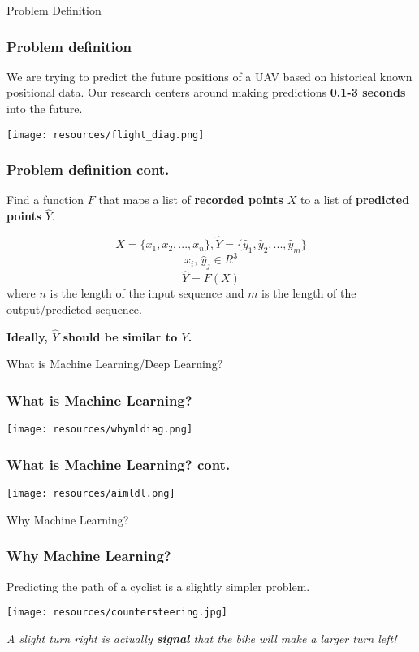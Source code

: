 \documentclass{beamer}
\begin{document}
\begin{frame}[standout]
    Problem Definition
\end{frame}

\begin{frame}
    \frametitle{Problem definition}

    We are trying to predict the future positions of a UAV based on historical
    known positional data. Our research centers around making predictions 
    \textbf{0.1-3 seconds} into the future.

    \centering
    \texttt{[image: resources/flight\_diag.png]}
\end{frame}


\begin{frame}
    \frametitle{Problem definition cont.}
    Find a function $F$ that maps a list of \textbf{recorded points} $X$ to a list 
    of \textbf{predicted points} $\hat{Y}$.

    $$ X = \{x_1, x_2, ..., x_n\}, \hat{Y} = \{\hat{y}_1, \hat{y}_2, ..., \hat{y}_m\} $$ 
    $$ x_i \text{, } \hat{y}_j \in R^3$$
    $$ \hat{Y} = F(X) $$
    where $n$ is the length of the input sequence and $m$ is the length of the 
    output/predicted sequence.

    \textbf{Ideally, $\hat{Y}$ should be similar to $Y$.}
\end{frame}

\begin{frame}[standout]
    What is Machine Learning/Deep Learning?
\end{frame}

\begin{frame}
    \frametitle{What is Machine Learning?}

    \centering
    \texttt{[image: resources/whymldiag.png]}
\end{frame}

\begin{frame}
    \frametitle{What is Machine Learning? cont.}

    \centering
    \texttt{[image: resources/aimldl.png]}
\end{frame}

\begin{frame}[standout]
    Why Machine Learning?
\end{frame}

\begin{frame}
    \frametitle{Why Machine Learning?}
    
    Predicting the path of a cyclist is a slightly simpler problem.
    
    \centering
    \texttt{[image: resources/countersteering.jpg]}

    \emph{A slight turn right is actually \textbf{signal} that the bike will
    make a larger turn left!}
\end{frame}
\end{document}
